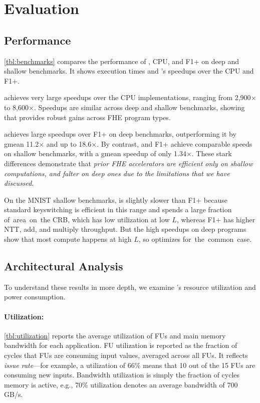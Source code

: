 \section{Evaluation}\label{sec:results}

\subsection{Performance}

\autoref{tbl:benchmarks} compares the performance of \name, CPU, and F1+ 
on deep and shallow benchmarks. It shows execution times
and \name's speedups over the CPU and F1+.

\name achieves very large speedups over the CPU implementations, ranging from 
2,900$\times$ to 8,600$\times$.
Speedups are similar across deep and shallow benchmarks, showing that \name provides robust gains
across FHE program types.

\name achieves large speedups over F1+ on deep benchmarks, outperforming it by
gmean 11.2$\times$ and up to 18.6$\times$.
By contrast, \name and F1+ achieve comparable speeds on shallow benchmarks,
with a gmean speedup of only 1.34$\times$.
These stark differences demonstrate that \emph{prior FHE accelerators are efficient
only on shallow computations, and falter on deep ones due to the limitations that we have discussed}.

On the MNIST shallow benchmarks, \name is slightly slower than F1+ because standard keyswitching
is efficient in this range and \name spends a large fraction of~area~on~the CRB,
which has low utilization at low $L$, whereas F1+ has higher 
NTT, add, and multiply throughput.
But the high speedups on deep programs show that most compute happens at high $L$,
so \name optimizes for~the~common~case.

\subsection{Architectural Analysis}\label{sec:architecturalAnalysis}

To understand these results in more depth, we examine \name's resource utilization and power consumption.

\tblUtilization

\paragraph{Utilization:}
\autoref{tbl:utilization} reports the average utilization of FUs and main memory bandwidth
for each application.
FU utilization is reported as the fraction of cycles that FUs are consuming input values, averaged across all FUs.
It reflects \emph{issue rate}---for example, a utilization of 66\% means that 10 out of the 15 FUs are consuming new inputs.
Bandwidth utilization is simply the fraction of cycles memory is active, e.g., 70\% utilization denotes an average bandwidth of 700\,GB/s.

